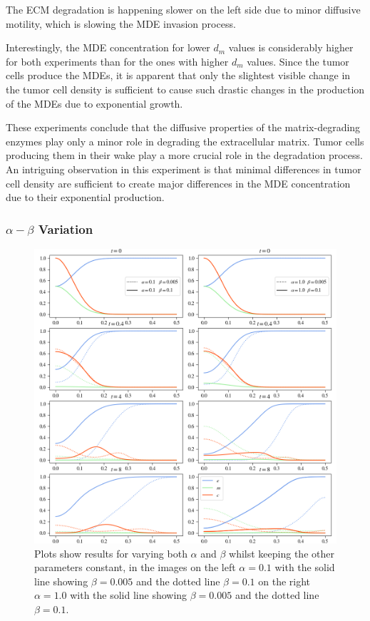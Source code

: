 The ECM degradation is happening slower on the left side due to minor diffusive motility, which is slowing the MDE invasion process.

Interestingly, the MDE concentration for lower $d_m$ values is considerably higher for both experiments than for the ones with higher $d_m$ values. Since the tumor cells produce the MDEs, it is apparent that only the slightest visible change in the tumor cell density is sufficient to cause such drastic changes in the production of the MDEs due to exponential growth. 

These experiments conclude that the diffusive properties of the matrix-degrading enzymes play only a minor role in degrading the extracellular matrix. Tumor cells producing them in their wake play a more crucial role in the degradation process. An intriguing observation in this experiment is that minimal differences in tumor cell density are sufficient to create major differences in the MDE concentration due to their exponential production.

\subsubsection*{$\alpha - \beta$ Variation}
\begin{figure}[h!]
    \centering
    \includegraphics[width=\textwidth]{resources/images/alpha_beta_variation.png}
    \caption{Plots show results for varying both $\alpha$ and $\beta$ whilst keeping the other parameters constant, in the images on the left $\alpha=0.1$ with the solid line showing $\beta = 0.005$ and the dotted line $\beta=0.1$ on the right $\alpha=1.0$ with the solid line showing $\beta = 0.005$ and the dotted line $\beta=0.1$.}
    \label{fig:alpha_beta_variation}
\end{figure}


